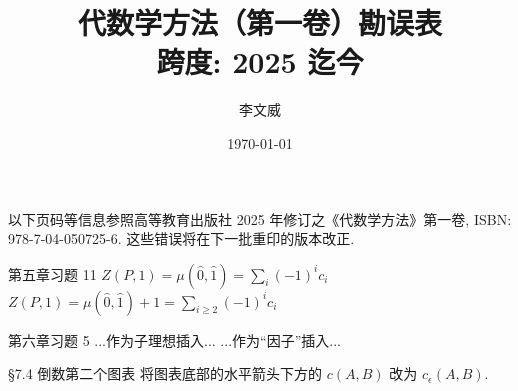 \documentclass{AJerrata}
\title{\bfseries 代数学方法（第一卷）勘误表 \\ 跨度: 2025 迄今 }
\author{李文威}
\date{\today}
\begin{document}
	\maketitle
	以下页码等信息参照高等教育出版社 2025 年修订之《代数学方法》第一卷, ISBN: 978-7-04-050725-6. 这些错误将在下一批重印的版本改正.

	\begin{Errata}
		\item[第五章习题 11]
		\Orig $Z(P,1) = \mu(\hat{0},\hat{1}) = \sum_i (-1)^i c_i$
		\Corr $Z(P,1) = \mu(\hat{0},\hat{1}) + 1 = \sum_{i \geq 2} (-1)^i c_i$
		
		\item[第六章习题 5]
		\Orig ...作为子理想插入...
		\Corr ...作为``因子''插入...

		\item[\S 7.4 倒数第二个图表]
		将图表底部的水平箭头下方的 $c(A, B)$ 改为 $c_\epsilon(A, B)$.
	\end{Errata}
\end{document}
